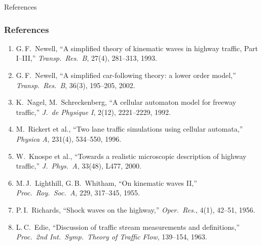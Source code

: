 \documentclass[11pt,aspectratio=169]{beamer}
\begin{document}
{
\begin{frame}[plain]{References}
\frametitle{References}
{\scriptsize\color{black}
\begin{enumerate}
\item[{[1]}] G.\,F.\ Newell, ``A simplified theory of kinematic waves in highway traffic, Part I--III,'' \textit{Transp.\ Res.\ B}, 27(4), 281--313, 1993.
\item[{[2]}] G.\,F.\ Newell, ``A simplified car-following theory: a lower order model,'' \textit{Transp.\ Res.\ B}, 36(3), 195--205, 2002.
\item[{[3]}] K.\ Nagel, M.\ Schreckenberg, ``A cellular automaton model for freeway traffic,'' \textit{J.\ de Physique I}, 2(12), 2221--2229, 1992.
\item[{[4]}] M.\ Rickert et al., ``Two lane traffic simulations using cellular automata,'' \textit{Physica A}, 231(4), 534--550, 1996.
\item[{[5]}] W.\ Knospe et al., ``Towards a realistic microscopic description of highway traffic,'' \textit{J.\ Phys.\ A}, 33(48), L477, 2000.
\item[{[6]}] M.\,J.\ Lighthill, G.\,B.\ Whitham, ``On kinematic waves II,'' \textit{Proc.\ Roy.\ Soc.\ A}, 229, 317--345, 1955.
\item[{[7]}] P.\,I.\ Richards, ``Shock waves on the highway,'' \textit{Oper.\ Res.}, 4(1), 42--51, 1956.
\item[{[8]}] L.\,C.\ Edie, ``Discussion of traffic stream measurements and definitions,'' \textit{Proc.\ 2nd Int.\ Symp.\ Theory of Traffic Flow}, 139--154, 1963.
\end{enumerate}
}
\end{frame}
}
\end{document}
